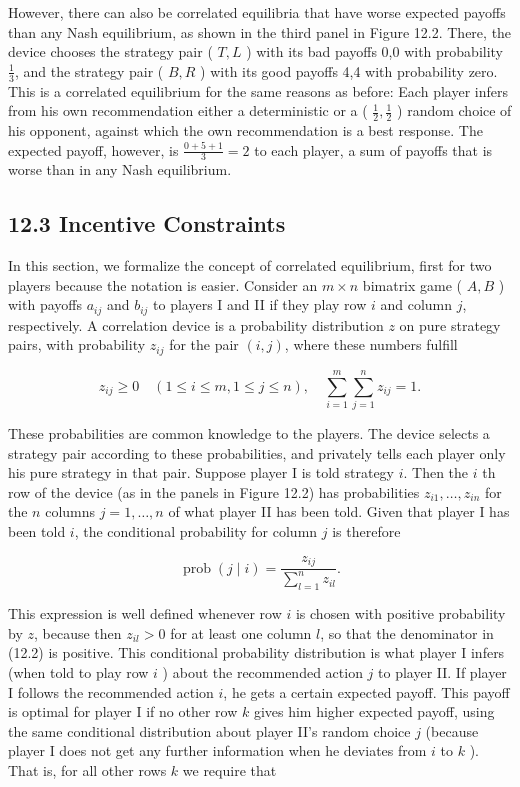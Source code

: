\documentclass[12pt]{article}
\begin{document}
However, there can also be correlated equilibria that have worse expected payoffs than any Nash equilibrium, as shown in the third panel in Figure 12.2. There, the device chooses the strategy pair ( $T, L$ ) with its bad payoffs 0,0 with probability $\frac{1}{3}$, and the strategy pair ( $B, R$ ) with its good payoffs 4,4 with probability zero. This is a correlated equilibrium for the same reasons as before: Each player infers from his own recommendation either a deterministic or a ( $\frac{1}{2}, \frac{1}{2}$ ) random choice of his opponent, against which the own recommendation is a best response. The expected payoff, however, is $\frac{0+5+1}{3}=2$ to each player, a sum of payoffs that is worse than in any Nash equilibrium.

\subsection*{12.3 Incentive Constraints}
In this section, we formalize the concept of correlated equilibrium, first for two players because the notation is easier. Consider an $m \times n$ bimatrix game ( $A, B$ ) with payoffs $a_{i j}$ and $b_{i j}$ to players I and II if they play row $i$ and column $j$, respectively. A correlation device is a probability distribution $z$ on pure strategy pairs, with probability $z_{i j}$ for the pair $(i, j)$, where these numbers fulfill


\begin{equation*}
z_{i j} \geq 0 \quad(1 \leq i \leq m, 1 \leq j \leq n), \quad \sum_{i=1}^{m} \sum_{j=1}^{n} z_{i j}=1 . \tag{12.1}
\end{equation*}


These probabilities are common knowledge to the players. The device selects a strategy pair according to these probabilities, and privately tells each player only his pure strategy in that pair. Suppose player I is told strategy $i$. Then the $i$ th row of the device (as in the panels in Figure 12.2) has probabilities $z_{i 1}, \ldots, z_{i n}$ for the $n$ columns $j=1, \ldots, n$ of what player II has been told. Given that player I has been told $i$, the conditional probability for column $j$ is therefore


\begin{equation*}
\operatorname{prob}(j \mid i)=\frac{z_{i j}}{\sum_{l=1}^{n} z_{i l}} . \tag{12.2}
\end{equation*}


This expression is well defined whenever row $i$ is chosen with positive probability by $z$, because then $z_{i l}>0$ for at least one column $l$, so that the denominator in (12.2) is positive. This conditional probability distribution is what player I infers (when told to play row $i$ ) about the recommended action $j$ to player II. If player I follows the recommended action $i$, he gets a certain expected payoff. This payoff is optimal for player I if no other row $k$ gives him higher expected payoff, using the same conditional distribution about player II's random choice $j$ (because player I does not get any further information when he deviates from $i$ to $k$ ). That is, for all other rows $k$ we require that
\end{document}
